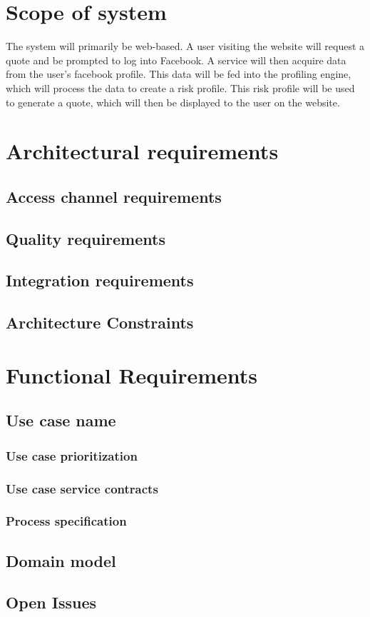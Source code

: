 \documentclass{article}
\begin{document}
\section{Scope of system}
The system will primarily be web-based. A user visiting the website will request a quote and be prompted to log into Facebook. A service will then acquire data from the user’s facebook profile. This data will be fed into the profiling engine, which will process the data to create a risk profile. This risk profile will be used to generate a quote, which will then be displayed to the user on the website.

\section{Architectural requirements}
	\subsection{Access channel requirements}
	\subsection{Quality requirements}
	\subsection{Integration requirements}
	\subsection{Architecture Constraints}

\section{Functional Requirements}

	\subsection{Use case name}
		\subsubsection{Use case prioritization}
		\subsubsection{Use case service contracts}
		\subsubsection{Process specification}
	
	\subsection{Domain model}
	\subsection{Open Issues}


	
\end{document}
